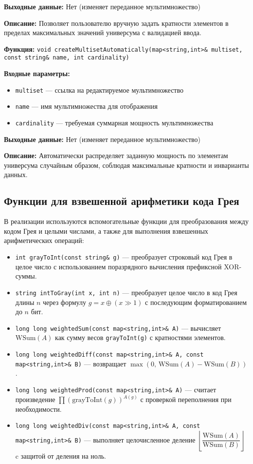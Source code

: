 \documentclass[12pt,a4paper]{article}
\begin{document}
\textbf{Выходные данные:} Нет (изменяет переданное мультимножество)

\textbf{Описание:} Позволяет пользователю вручную задать кратности элементов в пределах максимальных значений универсума с валидацией ввода.

\vspace{6pt}

\textbf{Функция:} \texttt{void createMultisetAutomatically(map<string,int>\& multiset, const string\& name, int cardinality)}

\textbf{Входные параметры:}
\begin{itemize}
    \item \texttt{multiset} — ссылка на редактируемое мультимножество
    \item \texttt{name} — имя мультимножества для отображения
    \item \texttt{cardinality} — требуемая суммарная мощность мультимножества
\end{itemize}

\textbf{Выходные данные:} Нет (изменяет переданное мультимножество)

\textbf{Описание:} Автоматически распределяет заданную мощность по элементам универсума случайным образом, соблюдая максимальные кратности и инварианты данных.

\subsection{Функции для взвешенной арифметики кода Грея}

В реализации используются вспомогательные функции для преобразования между кодом Грея и целыми числами, а также для выполнения взвешенных арифметических операций:
\begin{itemize}
    \item \texttt{int grayToInt(const string\& g)} — преобразует строковый код Грея в целое число с использованием поразрядного вычисления префиксной XOR-суммы.
    \item \texttt{string intToGray(int x, int n)} — преобразует целое число в код Грея длины $n$ через формулу $g = x \oplus (x \gg 1)$ с последующим форматированием до $n$ бит.
    \item \texttt{long long weightedSum(const map<string,int>\& A)} — вычисляет $\text{WSum}(A)$ как сумму весов \texttt{grayToInt(g)} с кратностями элементов.
    \item \texttt{long long weightedDiff(const map<string,int>\& A, const map<string,int>\& B)} — возвращает $\max(0,\,\text{WSum}(A)-\text{WSum}(B))$.
    \item \texttt{long long weightedProd(const map<string,int>\& A)} — считает произведение $\prod (\text{grayToInt}(g))^{A(g)}$ с проверкой переполнения при необходимости.
    \item \texttt{long long weightedDiv(const map<string,int>\& A, const map<string,int>\& B)} — выполняет целочисленное деление $\left\lfloor\dfrac{\text{WSum}(A)}{\text{WSum}(B)}\right\rfloor$ c защитой от деления на ноль.
\end{itemize}
\end{document}
